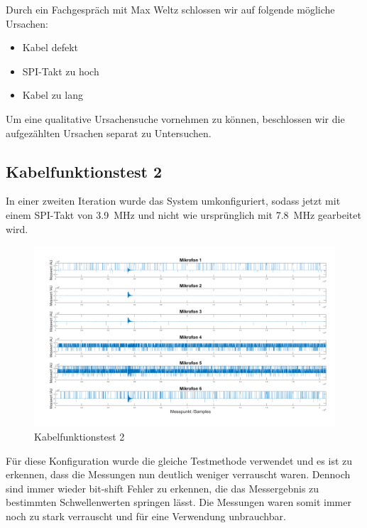 Durch ein Fachgespräch mit Max Weltz schlossen wir auf folgende mögliche Ursachen:

\begin{itemize}
	\item Kabel defekt
	\item SPI-Takt zu hoch
	\item Kabel zu lang
\end{itemize}

Um eine qualitative Ursachensuche vornehmen zu können, beschlossen wir die aufgezählten Ursachen separat zu Untersuchen.

\subsection{Kabelfunktionstest 2}

In einer zweiten Iteration wurde das System umkonfiguriert, sodass jetzt mit einem SPI-Takt von \SI{3,9}{MHz} und nicht wie ursprünglich mit \SI{7,8}{MHz} gearbeitet wird. 

\begin{figure}[h]
	\begin{center}
		\includegraphics[scale=0.1]{Sections/Tests/Test_2_d}
	\end{center}
	\caption{Kabelfunktionstest 2}
	\label{fig:Test_2_d}
\end{figure}

Für diese Konfiguration wurde die gleiche Testmethode verwendet und es ist zu erkennen, dass die Messungen nun deutlich weniger verrauscht waren. Dennoch sind immer wieder bit-shift Fehler zu erkennen, die das Messergebnis zu bestimmten Schwellenwerten springen lässt. Die Messungen waren somit immer noch zu stark verrauscht und für eine Verwendung unbrauchbar. 

